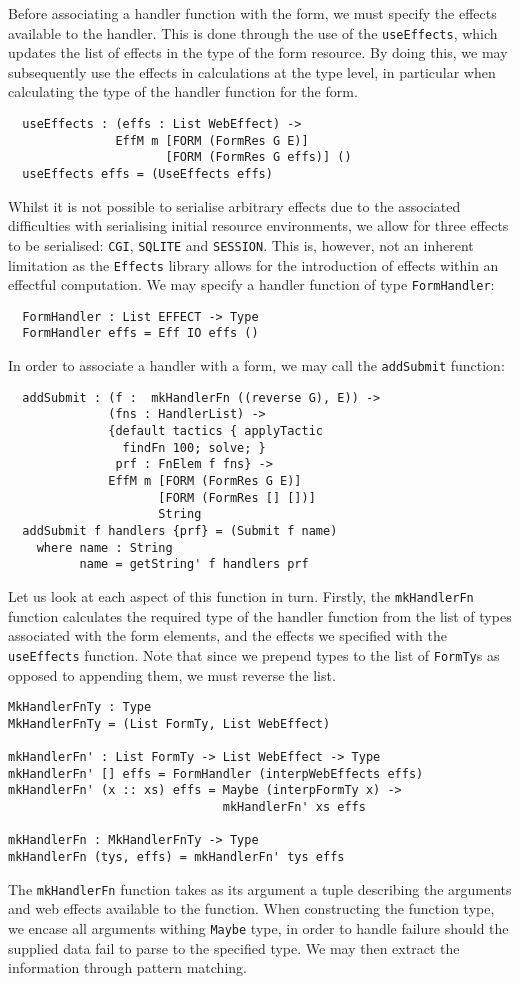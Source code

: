 \documentclass[preprint]{sigplanconf}
\begin{document}
Before associating a handler function with the form, we must specify the effects available to the handler. This is done through the use of the \texttt{useEffects}, which updates the list of effects in the type of the form resource. By doing this, we may subsequently use the effects in calculations at the type level, in particular when calculating the type of the handler function for the form. 
{\small
\begin{verbatim}
  useEffects : (effs : List WebEffect) ->
               EffM m [FORM (FormRes G E)] 
                      [FORM (FormRes G effs)] ()
  useEffects effs = (UseEffects effs)
\end{verbatim}}
Whilst it is not possible to serialise arbitrary effects due to the associated difficulties with serialising initial resource environments, we allow for three effects to be serialised: \texttt{CGI}, \texttt{SQLITE} and \texttt{SESSION}. This is, however, not an inherent limitation as the \texttt{Effects} library allows for the introduction of effects within an effectful computation.
%
We may specify a handler function of type \texttt{FormHandler}:
{\small
\begin{verbatim}
  FormHandler : List EFFECT -> Type
  FormHandler effs = Eff IO effs ()
\end{verbatim}
}
In order to associate a handler with a form, we may call the \texttt{addSubmit} function:
{\small
\begin{verbatim}
  addSubmit : (f :  mkHandlerFn ((reverse G), E)) ->
              (fns : HandlerList) ->
              {default tactics { applyTactic 
                findFn 100; solve; }
               prf : FnElem f fns} ->
              EffM m [FORM (FormRes G E)]
                     [FORM (FormRes [] [])] 
                     String
  addSubmit f handlers {prf} = (Submit f name)
    where name : String
          name = getString' f handlers prf          
\end{verbatim}
}
Let us look at each aspect of this function in turn. Firstly, the \texttt{mkHandlerFn} function calculates the required type of the handler function from the list of types associated with the form elements, and the effects we specified with the \texttt{useEffects} function. Note that since we prepend types to the list of \texttt{FormTy}s as opposed to appending them, we must reverse the list.
{\small
\begin{verbatim}
MkHandlerFnTy : Type
MkHandlerFnTy = (List FormTy, List WebEffect)

mkHandlerFn' : List FormTy -> List WebEffect -> Type
mkHandlerFn' [] effs = FormHandler (interpWebEffects effs) 
mkHandlerFn' (x :: xs) effs = Maybe (interpFormTy x) -> 
                              mkHandlerFn' xs effs 

mkHandlerFn : MkHandlerFnTy -> Type 
mkHandlerFn (tys, effs) = mkHandlerFn' tys effs 
\end{verbatim}
}
The \texttt{mkHandlerFn} function takes as its argument a tuple describing the arguments and web effects available to the function. When constructing the function type, we encase all arguments withing \texttt{Maybe} type, in order to handle failure should the supplied data fail to parse to the specified type. We may then extract the information through pattern matching.
\end{document}
